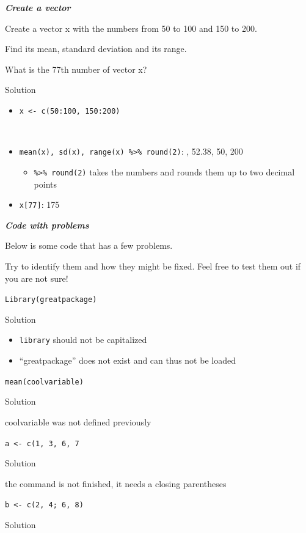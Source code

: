 \documentclass[
]{book}
\providecommand{\tightlist}{%
  \setlength{\itemsep}{0pt}\setlength{\parskip}{0pt}}
\begin{document}
\textbf{\emph{Create a vector}}

Create a vector x with the numbers from 50 to 100 and 150 to 200.

Find its mean, standard deviation and its range.

What is the 77th number of vector x?

Solution

\begin{itemize}
\tightlist
\item
  \texttt{x\ \textless{}-\ c(50:100,\ 150:200)}\strut \\
\item
  \texttt{mean(x),\ sd(x),\ range(x)\ \%\textgreater{}\%\ round(2)}: , 52.38, 50, 200

  \begin{itemize}
  \tightlist
  \item
    \texttt{\%\textgreater{}\%\ round(2)} takes the numbers and rounds them up to two decimal points
  \end{itemize}
\item
  \texttt{x{[}77{]}}: 175
\end{itemize}

\textbf{\emph{Code with problems}}

Below is some code that has a few problems.

Try to identify them and how they might be fixed. Feel free to test them out if you are not sure!

\texttt{Library(greatpackage)}

Solution

\begin{itemize}
\tightlist
\item
  \texttt{library} should not be capitalized
\item
  ``greatpackage'' does not exist and can thus not be loaded
\end{itemize}

\texttt{mean(coolvariable)}

Solution

coolvariable was not defined previously

\texttt{a\ \textless{}-\ c(1,\ 3,\ 6,\ 7}

Solution

the command is not finished, it needs a closing parentheses

\texttt{b\ \textless{}-\ c(2,\ 4;\ 6,\ 8)}

Solution
\end{document}
